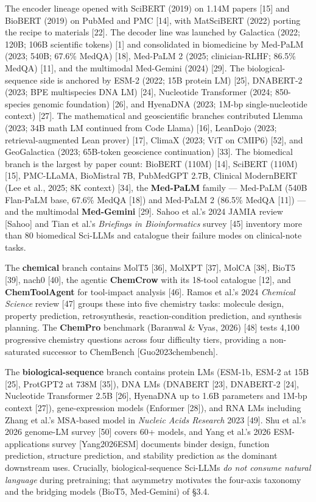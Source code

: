 The encoder lineage opened with SciBERT (2019) on 1.14M papers {[}15{]} and BioBERT (2019) on PubMed and PMC {[}14{]}, with MatSciBERT (2022) porting the recipe to materials {[}22{]}. The decoder line was launched by Galactica (2022; 120B; 106B scientific tokens) {[}1{]} and consolidated in biomedicine by Med-PaLM (2023; 540B; 67.6\% MedQA) {[}18{]}, Med-PaLM 2 (2025; clinician-RLHF; 86.5\% MedQA) {[}11{]}, and the multimodal Med-Gemini (2024) {[}29{]}. The biological-sequence side is anchored by ESM-2 (2022; 15B protein LM) {[}25{]}, DNABERT-2 (2023; BPE multispecies DNA LM) {[}24{]}, Nucleotide Transformer (2024; 850-species genomic foundation) {[}26{]}, and HyenaDNA (2023; 1M-bp single-nucleotide context) {[}27{]}. The mathematical and geoscientific branches contributed Llemma (2023; 34B math LM continued from Code Llama) {[}16{]}, LeanDojo (2023; retrieval-augmented Lean prover) {[}17{]}, ClimaX (2023; ViT on CMIP6) {[}52{]}, and GeoGalactica (2023; 65B-token geoscience continuation) {[}33{]}. The biomedical branch is the largest by paper count: BioBERT (110M) {[}14{]}, SciBERT (110M) {[}15{]}, PMC-LLaMA, BioMistral 7B, PubMedGPT 2.7B, Clinical ModernBERT (Lee et al., 2025; 8K context) {[}34{]}, the \textbf{Med-PaLM} family --- Med-PaLM (540B Flan-PaLM base, 67.6\% MedQA {[}18{]}) and Med-PaLM 2 (86.5\% MedQA {[}11{]}) --- and the multimodal \textbf{Med-Gemini} {[}29{]}. Sahoo et al.'s 2024 JAMIA review {[}Sahoo{]} and Tian et al.'s \emph{Briefings in Bioinformatics} survey {[}45{]} inventory more than 80 biomedical Sci-LLMs and catalogue their failure modes on clinical-note tasks.

The \textbf{chemical} branch contains MolT5 {[}36{]}, MolXPT {[}37{]}, MolCA {[}38{]}, BioT5 {[}39{]}, nach0 {[}40{]}, the agentic \textbf{ChemCrow} with its 18-tool catalogue {[}12{]}, and \textbf{ChemToolAgent} for tool-impact analysis {[}46{]}. Ramos et al.'s 2024 \emph{Chemical Science} review {[}47{]} groups these into five chemistry tasks: molecule design, property prediction, retrosynthesis, reaction-condition prediction, and synthesis planning. The \textbf{ChemPro} benchmark (Baranwal \& Vyas, 2026) {[}48{]} tests 4,100 progressive chemistry questions across four difficulty tiers, providing a non-saturated successor to ChemBench {[}Guo2023chembench{]}.

The \textbf{biological-sequence} branch contains protein LMs (ESM-1b, ESM-2 at 15B {[}25{]}, ProtGPT2 at 738M {[}35{]}), DNA LMs (DNABERT {[}23{]}, DNABERT-2 {[}24{]}, Nucleotide Transformer 2.5B {[}26{]}, HyenaDNA up to 1.6B parameters and 1M-bp context {[}27{]}), gene-expression models (Enformer {[}28{]}), and RNA LMs including Zhang et al.'s MSA-based model in \emph{Nucleic Acids Research} 2023 {[}49{]}. Shu et al.'s 2026 genome-LM survey {[}50{]} covers 60+ models, and Yang et al.'s 2026 ESM-applications survey {[}Yang2026ESM{]} documents binder design, function prediction, structure prediction, and stability prediction as the dominant downstream uses. Crucially, biological-sequence Sci-LLMs \emph{do not consume natural language} during pretraining; that asymmetry motivates the four-axis taxonomy and the bridging models (BioT5, Med-Gemini) of §3.4.

